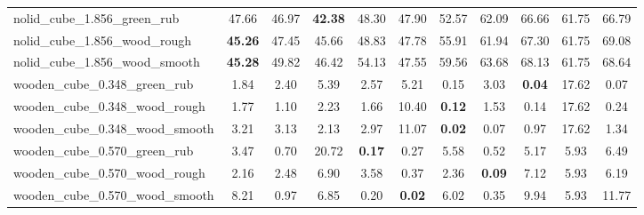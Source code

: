 \begin{table}[H]
{\begin{tabular}{l cccccccccc}
        nolid\_cube\_1.856\_green\_rub & 47.66 & 46.97 & \textbf{42.38} & 48.30 & 47.90 & 52.57 & 62.09 & 66.66 & 61.75 & 66.79 \\
        nolid\_cube\_1.856\_wood\_rough & \textbf{45.26} & 47.45 & 45.66 & 48.83 & 47.78 & 55.91 & 61.94 & 67.30 & 61.75 & 69.08 \\
        nolid\_cube\_1.856\_wood\_smooth & \textbf{45.28} & 49.82 & 46.42 & 54.13 & 47.55 & 59.56 & 63.68 & 68.13 & 61.75 & 68.64 \\
        wooden\_cube\_0.348\_green\_rub & 1.84 & 2.40 & 5.39 & 2.57 & 5.21 & 0.15 & 3.03 & \textbf{0.04} & 17.62 & 0.07 \\
        wooden\_cube\_0.348\_wood\_rough & 1.77 & 1.10 & 2.23 & 1.66 & 10.40 & \textbf{0.12} & 1.53 & 0.14 & 17.62 & 0.24 \\
        wooden\_cube\_0.348\_wood\_smooth & 3.21 & 3.13 & 2.13 & 2.97 & 11.07 & \textbf{0.02} & 0.07 & 0.97 & 17.62 & 1.34 \\
        wooden\_cube\_0.570\_green\_rub & 3.47 & 0.70 & 20.72 & \textbf{0.17} & 0.27 & 5.58 & 0.52 & 5.17 & 5.93 & 6.49 \\
        wooden\_cube\_0.570\_wood\_rough & 2.16 & 2.48 & 6.90 & 3.58 & 0.37 & 2.36 & \textbf{0.09} & 7.12 & 5.93 & 6.19 \\
        wooden\_cube\_0.570\_wood\_smooth & 8.21 & 0.97 & 6.85 & 0.20 & \textbf{0.02} & 6.02 & 0.35 & 9.94 & 5.93 & 11.77 \\
        \bottomrule
    \end{tabular}
    }
\end{table}
